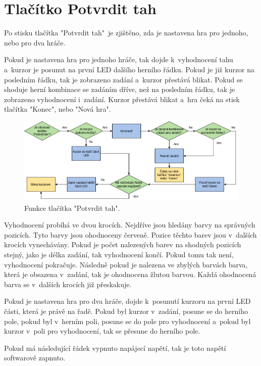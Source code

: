 \section{Tlačítko Potvrdit tah}
Po stisku tlačítka "Potvrdit tah"\  je zjištěno, zda je nastavena hra pro jednoho, nebo pro dva hráče. 

Pokud je nastavena hra pro jednoho hráče, tak dojde k~vyhodnocení tahu a~kurzor je posunut na první LED dalšího herního řádku. Pokud je již 
kurzor na posledním řádku, tak je zobrazeno zadání a~kurzor přestává blikat. Pokud se shoduje herní kombinace se zadáním dříve, než na 
posledním řádku, tak je zobrazeno vyhodnocení i~zadání. Kurzor přestává blikat a~hra čeká na stisk tlačítka "Konec", nebo "Nová hra". 

\begin{figure}[!h]
    \begin{center}
      \includegraphics[scale=0.5]{obrazky/Enter.png}
    \end{center}
    \caption[Funkce tlačítka Potvrdit tah]{Funkce tlačítka "Potvrdit tah".}
  \end{figure}

Vyhodnocení probíhá ve dvou krocích. Nejdříve jsou hledány barvy na správných pozicích. Tyto barvy jsou ohodnoceny červeně. Pozice těchto 
barev jsou v~dalších krocích vynechávány. Pokud je počet nalezených barev na shodných pozicích stejný, jako je délka zadání, tak vyhodnocení 
končí. Pokud tomu tak není, vyhodnocení pokračuje. Následně pokud je nalezena ve zbylých barvách barva, která je obsazena v~zadání, tak je 
ohodnocena žlutou barvou. Každá ohodnocená barva se v~dalších krocích již přeskakuje. 

Pokud je nastavena hra pro dva hráče, dojde k~posunutí kurzoru na první LED části, která je právě na řadě. Pokud byl kurzor v~zadání, posune
se do herního pole, pokud byl v~herním poli, posune se do pole pro vyhodnocení a~pokud byl kurzor v~poli pro vyhodnocení, tak se přesune
do herního pole. 

Pokud má následující řádek vypnuto napájecí napětí, tak je toto napětí softwarově zapnuto. 

